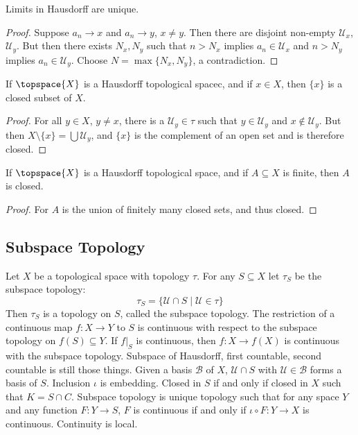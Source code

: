     \begin{theorem}
        Limits in Hausdorff are unique.
    \end{theorem}
    \begin{proof}
        Suppose $a_{n}\rightarrow{x}$ and $a_{n}\rightarrow{y}$, $x\ne{y}$.
        Then there are disjoint non-empty $\mathcal{U}_{x}$,
        $\mathcal{U}_{y}$. But then there exists $N_{x},N_{y}$ such that
        $n>N_{x}$ implies $a_{n}\in\mathcal{U}_{x}$ and $n>N_{y}$ implies
        $a_{n}\in\mathcal{U}_{y}$. Choose $N=\max\{N_{x},N_{y}\}$, a
        contradiction.
    \end{proof}
    \begin{theorem}
        If $\topspace{X}$ is a Hausdorff topological spacec, and if
        $x\in{X}$, then $\{x\}$ is a closed subset of $X$.
    \end{theorem}
    \begin{proof}
        For all $y\in{X}$, $y\ne{x}$, there is a $\mathcal{U}_{y}\in\tau$
        such that $y\in\mathcal{U}_{y}$ and $x\notin\mathcal{U}_{y}$. But
        then $X\setminus\{x\}=\bigcup\mathcal{U}_{y}$, and $\{x\}$ is
        the complement of an open set and is therefore closed.
    \end{proof}
    \begin{theorem}
        If $\topspace{X}$ is a Hausdorff topological space, and if
        $A\subseteq{X}$ is finite, then $A$ is closed.
    \end{theorem}
    \begin{proof}
        For $A$ is the union of finitely many closed sets, and thus closed.
    \end{proof}
    \subsection{Subspace Topology}
        Let $X$ be a topological space with topology $\tau$. For any
        $S\subseteq{X}$ let $\tau_{S}$ be the subspace topology:
        \begin{equation}
            \tau_{S}=\{\mathcal{U}\cap{S}\;|\;\mathcal{U}\in\tau\}
        \end{equation}
        Then $\tau_{S}$ is a topology on $S$, called the subspace
        topology. The restriction of a continuous map
        $f:X\rightarrow{Y}$ to $S$ is continuous with respect to the
        subspace topology on $f(S)\subseteq{Y}$. If $f|_{S}$ is
        continuous, then $f:X\rightarrow{f}(X)$ is continuous with the
        subspace topology. Subspace of Hausdorff, first countable, second
        countable is still those things. Given a basis $\mathcal{B}$ of $X$,
        $\mathcal{U}\cap{S}$ with $\mathcal{U}\in\mathcal{B}$ forms a basis of
        $S$. Inclusion $\iota$ is embedding. Closed in $S$ if and only if closed
        in $X$ such that $K=S\cap{C}$. Subspace topology is unique topology such
        that for any space $Y$ and any function $F:Y\rightarrow{S}$, $F$ is
        continuous if and only if $\iota\circ{F}:Y\rightarrow{X}$ is continuous.
        Continuity is local.
